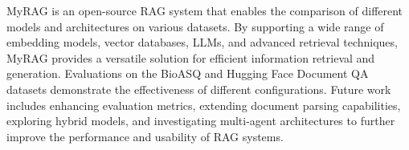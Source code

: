 \documentclass{scrartcl}
\begin{document}
MyRAG is an open-source RAG system that enables the comparison of different models and architectures on various datasets. By supporting a wide range of embedding models, vector databases, LLMs, and advanced retrieval techniques, MyRAG provides a versatile solution for efficient information retrieval and generation. Evaluations on the BioASQ and Hugging Face Document QA datasets demonstrate the effectiveness of different configurations. Future work includes enhancing evaluation metrics, extending document parsing capabilities, exploring hybrid models, and investigating multi-agent architectures to further improve the performance and usability of RAG systems.





\newpage
\appendix
\end{document}
